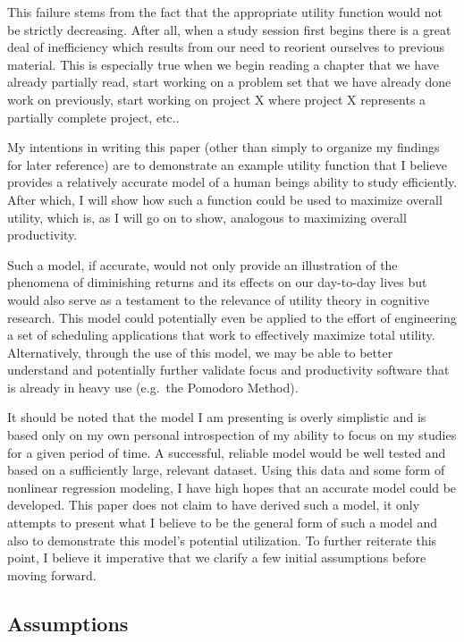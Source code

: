 \documentclass[12pt]{article}
\begin{document}
    This failure stems from the fact that the appropriate utility function would not be strictly decreasing. After all, when a study session first begins there is a great deal of inefficiency which results from our need to reorient ourselves to previous material. This is especially true when we begin reading a chapter that we have already partially read, start working on a problem set that we have already done work on previously, start working on project X where project X represents a partially complete project, etc.. 
    
    My intentions in writing this paper (other than simply to organize my findings for later reference) are to demonstrate an example utility function that I believe provides a relatively accurate model of a human beings ability to study efficiently. After which, I will show how such a function could be used to maximize overall utility, which is, as I will go on to show, analogous to maximizing overall productivity.

    
    Such a model, if accurate, would not only provide an illustration of the phenomena of diminishing returns and its effects on our day-to-day lives but would also serve as a testament to the relevance of utility theory in cognitive research. This model could potentially even be applied to the effort of engineering a set of scheduling applications that work to effectively maximize total utility. Alternatively, through the use of this model, we may be able to better understand and potentially further validate focus and productivity software that is already in heavy use (e.g.\ the Pomodoro Method). 

    It should be noted that the model I am presenting is overly simplistic and is based only on my own personal introspection of my ability to focus on my studies for a given period of time. A successful, reliable model would be well tested and based on a sufficiently large, relevant dataset. Using this data and some form of nonlinear regression modeling, I have high hopes that an accurate model could be developed. This paper does not claim to have derived such a model, it only attempts to present what I believe to be the general form of such a model and also to demonstrate this model's potential utilization. To further reiterate this point, I believe it imperative that we clarify a few initial assumptions before moving forward. 

    \subsection*{Assumptions}
\end{document}
